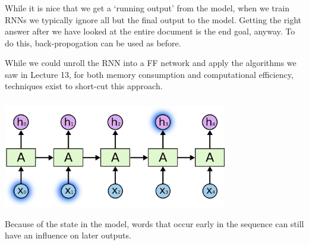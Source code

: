 \documentclass[xetex,mathserif,serif,aspectratio=169]{beamer}
\begin{document}
\begin{frame}[fragile] \frametitle{} \oldB \small


While it is nice that we get a `running output' from the model, when
we train RNNs we typically ignore all but the final output to the
model. Getting the right answer after we have looked at the entire
document is the end goal, anyway. To do this, back-propogation can
be used as before.

While we could unroll the RNN into a FF network and apply the algorithms
we saw in Lecture 13, for both memory consumption and computational
efficiency, techniques exist to short-cut this approach.

\end{frame}

\begin{frame}[fragile] \frametitle{} \oldB \small


\end{frame}

\begin{frame}[fragile] \frametitle{} \oldB \small


\end{frame}

\begin{frame}[fragile] \frametitle{} \oldB \small

\begin{center}
\includegraphics[height=4.5cm]{img/cloah03.png}
\end{center}

Because of the state in the model, words that occur
early in the sequence can still have an influence on
later outputs.

\end{frame}
\end{document}
